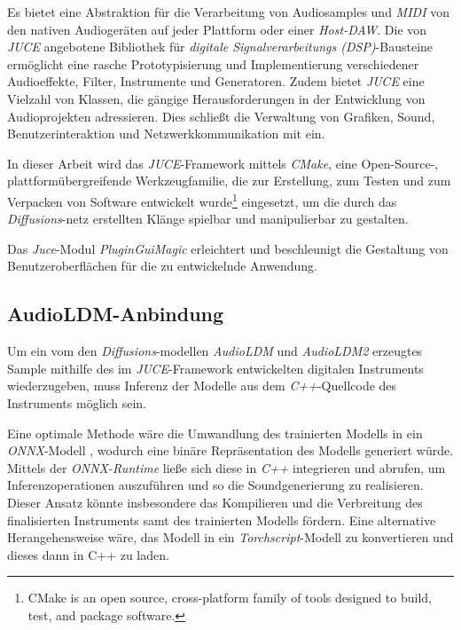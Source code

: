 \documentclass[
  a4paper,  %
  twoside,  %
  bibliography=totoc,
  headsepline,
  cleardoublepage=empty,
  parskip=half,
  draft=false
]{scrbook}
\begin{document}
Es bietet eine Abstraktion für die Verarbeitung von Audiosamples und \emph{MIDI} von den nativen Audiogeräten auf jeder Plattform oder einer \emph{Host-DAW}. Die von \emph{JUCE} angebotene Bibliothek für \emph{digitale Signalverarbeitungs (DSP)}-Bausteine ermöglicht eine rasche Prototypisierung und Implementierung verschiedener Audioeffekte, Filter, Instrumente und Generatoren. \cite{noauthor_juce_nodate} Zudem bietet \emph{JUCE} eine Vielzahl von Klassen, die gängige Herausforderungen in der Entwicklung von Audioprojekten adressieren. Dies schließt die Verwaltung von Grafiken, Sound, Benutzerinteraktion und Netzwerkkommunikation mit ein. \cite{robinson_getting_2013}

In dieser Arbeit wird das \emph{JUCE}-Framework mittels \emph{CMake}, \glqq eine Open-Source-, plattformübergreifende Werkzeugfamilie, die zur Erstellung, zum Testen und zum Verpacken von Software entwickelt wurde\grqq \footnote{CMake is an open source, cross-platform family of tools designed to build, test, and package software.} \cite{noauthor_cmake_nodate} eingesetzt, um die durch das \emph{Diffusions}-netz erstellten Klänge spielbar und manipulierbar zu gestalten. 

Das \emph{Juce}-Modul \emph{PluginGuiMagic} \cite{walz_plugin_nodate} erleichtert und beschleunigt die Gestaltung von Benutzeroberflächen für die zu entwickelnde Anwendung.

\subsection{AudioLDM-Anbindung} \label{sec:api}
Um ein vom den \emph{Diffusions}-modellen \emph{AudioLDM} und \emph{AudioLDM2} erzeugtes Sample mithilfe des im \emph{JUCE}-Framework entwickelten digitalen Instruments wiederzugeben, muss Inferenz der Modelle aus dem \emph{C++}-Quellcode des Instruments möglich sein.

Eine optimale Methode wäre die Umwandlung des trainierten Modells in ein \emph{ONNX}-Modell \cite{noauthor_onnx_nodate}, wodurch eine binäre Repräsentation des Modells generiert würde. Mittels der \emph{ONNX-Runtime} \cite{noauthor_onnx-runtime_nodate} ließe sich diese in \emph{C++} integrieren und abrufen, um Inferenzoperationen auszuführen und so die Soundgenerierung zu realisieren. Dieser Ansatz könnte insbesondere das Kompilieren und die Verbreitung des finalisierten Instruments samt des trainierten Modells fördern. Eine alternative Herangehensweise wäre, das Modell in ein \emph{Torchscript}-Modell \cite{noauthor_torchscript_nodate} zu konvertieren und dieses dann in C++ zu laden. \cite{oli_larkin_machine_2023}
\end{document}
